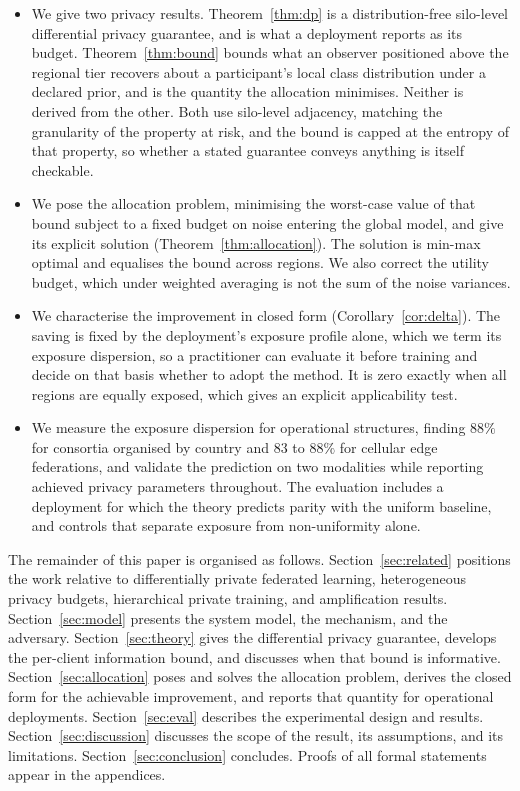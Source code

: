 \documentclass[acmsmall,screen,review,anonymous]{acmart}
\theoremstyle{acmdefinition}%
\begin{document}
\begin{itemize}
\item We give two privacy results. Theorem~\ref{thm:dp} is a distribution-free
silo-level differential privacy guarantee, and is what a deployment reports as its
budget. Theorem~\ref{thm:bound} bounds what an observer positioned above the regional
tier recovers about a participant's local class distribution under a declared prior,
and is the quantity the allocation minimises. Neither is derived from the other. Both
use silo-level adjacency, matching the granularity of the property at risk, and the
bound is capped at the entropy of that property, so whether a stated guarantee conveys
anything is itself checkable.

\item We pose the allocation problem, minimising the worst-case value of that bound
subject to a fixed budget on noise entering the global model, and give its explicit
solution (Theorem~\ref{thm:allocation}). The solution is min-max optimal and equalises
the bound across regions. We also correct the utility budget, which under weighted
averaging is not the sum of the noise variances.

\item We characterise the improvement in closed form (Corollary~\ref{cor:delta}). The
saving is fixed by the deployment's exposure profile alone, which we term its exposure
dispersion, so a practitioner can evaluate it before training and decide on that basis
whether to adopt the method. It is zero exactly when all regions are equally exposed,
which gives an explicit applicability test.

\item We measure the exposure dispersion for operational structures, finding $88\%$ for
consortia organised by country and $83$ to $88\%$ for cellular edge federations, and
validate the prediction on two modalities while reporting achieved privacy parameters
throughout. The evaluation includes a deployment for which the theory predicts parity
with the uniform baseline, and controls that separate exposure from non-uniformity
alone.
\end{itemize}

The remainder of this paper is organised as follows.
Section~\ref{sec:related} positions the work relative to differentially private
federated learning, heterogeneous privacy budgets, hierarchical private training,
and amplification results. Section~\ref{sec:model} presents the system model, the
mechanism, and the adversary. Section~\ref{sec:theory} gives the differential
privacy guarantee, develops the per-client information bound, and discusses when
that bound is informative. Section~\ref{sec:allocation}
poses and solves the allocation problem, derives the closed form for the
achievable improvement, and reports that quantity for operational deployments.
Section~\ref{sec:eval} describes the experimental design and results.
Section~\ref{sec:discussion} discusses the scope of the result, its assumptions,
and its limitations. Section~\ref{sec:conclusion} concludes. Proofs of all formal
statements appear in the appendices.
\end{document}
